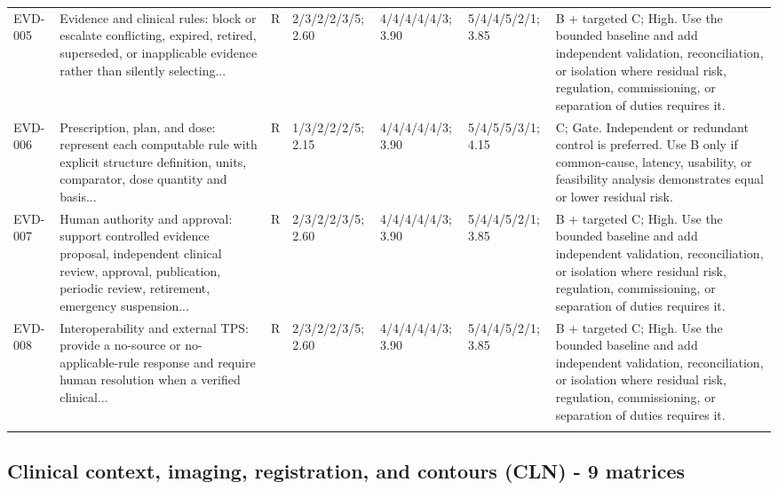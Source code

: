 \documentclass[11pt,letterpaper]{article}
\begin{document}
\begin{scriptsize}
\begin{longtable}{@{}L{0.11\textwidth}L{0.165\textwidth}L{0.04\textwidth}L{0.115\textwidth}L{0.115\textwidth}L{0.115\textwidth}L{0.235\textwidth}@{}}
\addlinespace[2pt]
EVD-005 & Evidence and clinical rules: block or escalate conflicting, expired, retired, superseded, or inapplicable evidence rather than silently selecting... & R & 2/3/2/2/3/5; 2.60 & 4/4/4/4/4/3; 3.90 & 5/4/4/5/2/1; 3.85 & B + targeted C; High. Use the bounded baseline and add independent validation, reconciliation, or isolation where residual risk, regulation, commissioning, or separation of duties requires it. \\
\addlinespace[2pt]
EVD-006 & Prescription, plan, and dose: represent each computable rule with explicit structure definition, units, comparator, dose quantity and basis... & R & 1/3/2/2/2/5; 2.15 & 4/4/4/4/4/3; 3.90 & 5/4/5/5/3/1; 4.15 & C; Gate. Independent or redundant control is preferred. Use B only if common-cause, latency, usability, or feasibility analysis demonstrates equal or lower residual risk. \\
\addlinespace[2pt]
EVD-007 & Human authority and approval: support controlled evidence proposal, independent clinical review, approval, publication, periodic review, retirement, emergency suspension... & R & 2/3/2/2/3/5; 2.60 & 4/4/4/4/4/3; 3.90 & 5/4/4/5/2/1; 3.85 & B + targeted C; High. Use the bounded baseline and add independent validation, reconciliation, or isolation where residual risk, regulation, commissioning, or separation of duties requires it. \\
\addlinespace[2pt]
EVD-008 & Interoperability and external TPS: provide a no-source or no-applicable-rule response and require human resolution when a verified clinical... & R & 2/3/2/2/3/5; 2.60 & 4/4/4/4/4/3; 3.90 & 5/4/4/5/2/1; 3.85 & B + targeted C; High. Use the bounded baseline and add independent validation, reconciliation, or isolation where residual risk, regulation, commissioning, or separation of duties requires it. \\
\addlinespace[2pt]
\end{longtable}
\end{scriptsize}

\subsection{Clinical context, imaging, registration, and contours (CLN) - 9 matrices}
\end{document}
